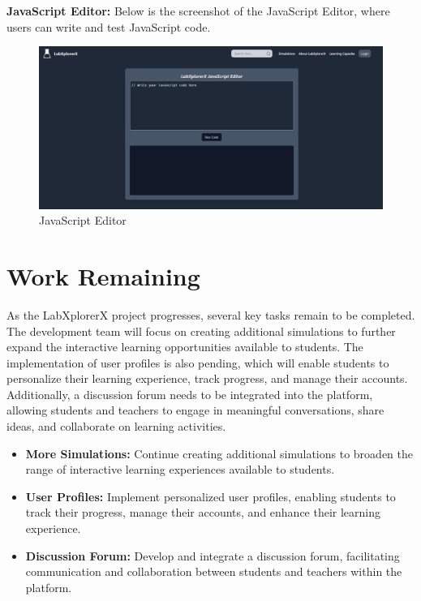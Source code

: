 \textbf{JavaScript Editor:} Below is the screenshot of the JavaScript Editor, where users can write and test JavaScript code.
\begin{figure}[H]
    \centering
    \includegraphics[width = 16cm]{Diagrams/output/js.png}
    \caption{JavaScript Editor}
\end{figure}


\section{Work Remaining}
As the LabXplorerX project progresses, several key tasks remain to be completed. The development team will focus on creating additional simulations to further expand the interactive learning opportunities available to students. The implementation of user profiles is also pending, which will enable students to personalize their learning experience, track progress, and manage their accounts. Additionally, a discussion forum needs to be integrated into the platform, allowing students and teachers to engage in meaningful conversations, share ideas, and collaborate on learning activities.

\begin{itemize}[leftmargin=1cm]
    \item \textbf{More Simulations:} Continue creating additional simulations to broaden the range of interactive learning experiences available to students.
    
    \item \textbf{User Profiles:} Implement personalized user profiles, enabling students to track their progress, manage their accounts, and enhance their learning experience.
    
    \item \textbf{Discussion Forum:} Develop and integrate a discussion forum, facilitating communication and collaboration between students and teachers within the platform.
\end{itemize}